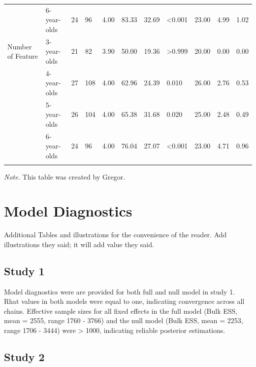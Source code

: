 \documentclass[
  man]{apa6}
\begin{document}
\begin{landscape}
\begin{table}[tbp]
\begin{center}
\begin{threeparttable}
\begin{tabular}{lllllllllll}
 & 6-year-olds & 24 & 96 & 4.00 & 83.33 & 32.69 & <0.001 & 23.00 & 4.99 & 1.02\\
Number of Feature & 3-year-olds & 21 & 82 & 3.90 & 50.00 & 19.36 & >0.999 & 20.00 & 0.00 & 0.00\\
 & 4-year-olds & 27 & 108 & 4.00 & 62.96 & 24.39 & 0.010 & 26.00 & 2.76 & 0.53\\
 & 5-year-olds & 26 & 104 & 4.00 & 65.38 & 31.68 & 0.020 & 25.00 & 2.48 & 0.49\\
 & 6-year-olds & 24 & 96 & 4.00 & 76.04 & 27.07 & <0.001 & 23.00 & 4.71 & 0.96\\
\bottomrule
\addlinespace
\end{tabular}

\begin{tablenotes}[para]
\normalsize{\textit{Note.} This table was created by Gregor.}
\end{tablenotes}

\end{threeparttable}
\end{center}

\end{table}

\end{landscape}

\section{Model Diagnostics}\label{model-diagnostics}

Additional Tables and illustrations for the convenience of the reader. Add illustrations they said; it will add value they said.

\subsection{Study 1}\label{study-1-2}

Model diagnostics were are provided for both full and null model in study 1. Rhat values in both models were equal to one, indicating convergence across all chains. Effective sample sizes for all fixed effects in the full model (Bulk ESS, mean = 2555, range 1760 - 3766) and the null model (Bulk ESS, mean = 2253, range 1706 - 3444) were \textgreater{} 1000, indicating reliable posterior estimations.

\subsection{Study 2}\label{study-2-2}
\end{document}
